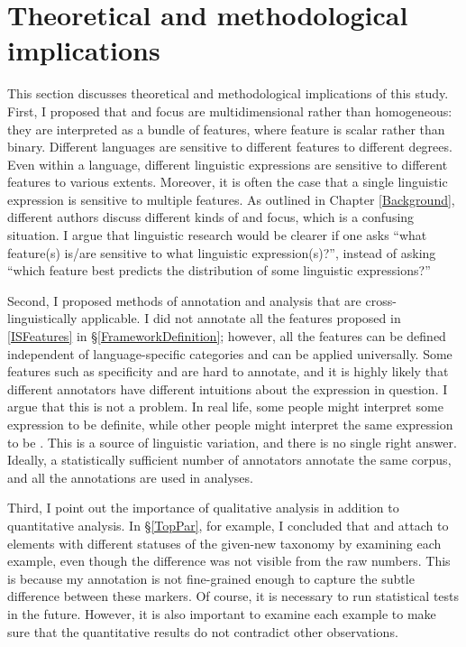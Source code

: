 \section{Theoretical and methodological implications}

This section discusses theoretical and methodological implications of
this study.
First, I proposed that  and focus are multidimensional
rather than homogeneous: they are interpreted as a bundle of features, where feature is scalar rather than binary.
Different languages are sensitive to different features to different degrees.
Even within a language,
different linguistic expressions are sensitive to different features to various extents.
Moreover, it is often the case that
a single linguistic expression is sensitive to multiple features.
As outlined in Chapter \ref{Background},
different authors discuss different kinds of  and focus,
which is a confusing situation.
I argue that linguistic research would be clearer if one asks
``what feature(s) is/are sensitive to what linguistic expression(s)?'',
instead of asking
``which feature best predicts the distribution of some linguistic expressions?''

Second,
I proposed methods of annotation and analysis
that are cross-lin\-guis\-tically applicable.
I did not annotate all the features proposed in \ref{ISFeatures} in \S \ref{FrameworkDefinition};
however, all the features can be defined independent of language-specific categories and can be applied universally.
Some features such as specificity and  are hard to annotate, and it is highly likely that different annotators have different intuitions about the expression in question.
I argue that this is not a problem.
In real life,
some people might interpret some expression to be definite,
while other people might interpret the same expression to be .
This is a source of linguistic variation, and there is no single right answer.
Ideally, a statistically sufficient number of annotators annotate the same corpus, and all the annotations are used in analyses.

Third,
I point out the importance of qualitative analysis in addition to quantitative analysis.
In \S \ref{TopPar}, for example,
I concluded that  and  attach to elements with different statuses of the given-new taxonomy by examining each example,
even though the difference was not visible from the raw numbers.
This is because my annotation is not fine-grained enough to capture the subtle difference between these markers.
Of course, it is necessary to run statistical tests in the future.
However, it is also important to examine each example to make sure that
the quantitative results do not contradict other observations.



